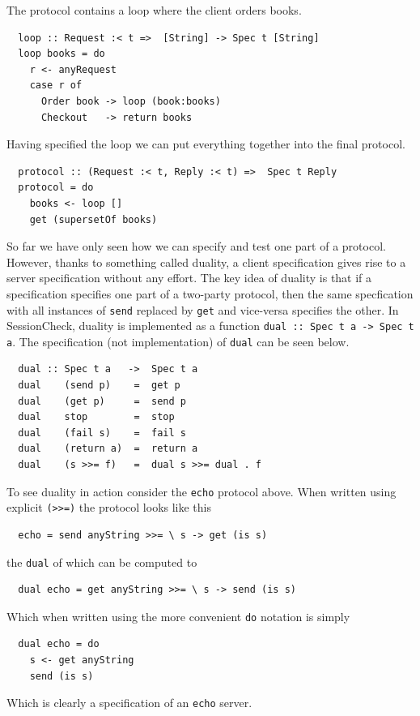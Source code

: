 \documentclass{article}
\begin{document}
The protocol contains a loop where the client orders books.
%
\begin{verbatim}
  loop :: Request :< t =>  [String] -> Spec t [String]
  loop books = do
    r <- anyRequest
    case r of
      Order book -> loop (book:books)
      Checkout   -> return books
\end{verbatim}
%
Having specified the loop we can put everything together into the final protocol.
%
\begin{verbatim}
  protocol :: (Request :< t, Reply :< t) =>  Spec t Reply
  protocol = do
    books <- loop []
    get (supersetOf books)
\end{verbatim}

So far we have only seen how we can specify and test one part of a protocol.
%
However, thanks to something called duality, a client specification gives rise
to a server specification without any effort.
%
The key idea of duality is that if a specification specifies one part
of a two-party protocol, then the same specfication with all instances
of \texttt{send} replaced by \texttt{get}
and vice-versa specifies the other.
%
In SessionCheck, duality is implemented as a function \texttt{dual :: Spec t a -> Spec t a}.
%
The specification (not implementation) of \texttt{dual} can be seen below.
%
\begin{verbatim}
  dual :: Spec t a   ->  Spec t a
  dual    (send p)    =  get p
  dual    (get p)     =  send p
  dual    stop        =  stop
  dual    (fail s)    =  fail s
  dual    (return a)  =  return a
  dual    (s >>= f)   =  dual s >>= dual . f
\end{verbatim}
%
To see duality in action consider the \texttt{echo} protocol above.
%
When written using explicit \texttt{(>>=)} the protocol looks like this
%
\begin{verbatim}
  echo = send anyString >>= \ s -> get (is s)
\end{verbatim}
%
the \texttt{dual} of which can be computed to
%
\begin{verbatim}
  dual echo = get anyString >>= \ s -> send (is s)
\end{verbatim}
%
Which when written using the more convenient \texttt{do} notation is simply
%
\begin{verbatim}
  dual echo = do
    s <- get anyString
    send (is s)
\end{verbatim}
%
Which is clearly a specification of an \texttt{echo} server.
\end{document}
